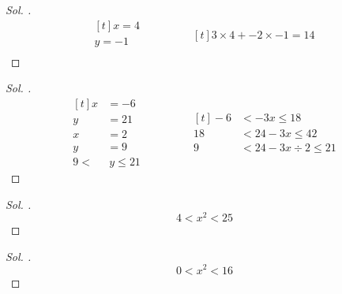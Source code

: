 \documentclass{article}
\theoremstyle{mytheoremstyle}
\theoremstyle{mytheoremstyle}
\theoremstyle{myproblemstyle}
\begin{document}
\begin{proof}[\textit{ Sol. }]
  \begin{equation*}
    \begin{aligned}[t]
      x = 4\\
      y = -1\\
    \end{aligned}
    \qquad\qquad
    \begin{aligned}[t]
      3 \times 4 + -2 \times -1 = 14
    \end{aligned}
  \end{equation*}
\end{proof}

\begin{problem}[$ -6 \le x < 2 $, $ 3x + 2y = 24 $ ise $ y $'nin tanım aralığı?]
\end{problem}

\begin{proof}[\textit{ Sol. }]
  \begin{equation*}
    \begin{aligned}[t]
      x &= -6\\
      y &= 21\\
      x &= 2\\
      y &= 9\\
      9 <&\ y \le 21
    \end{aligned}
    \qquad\qquad
    \begin{aligned}[t]
      -6 &< -3x \le 18\\
      18 &< 24 - 3x \le 42\\
      9 &< 24 - 3x \div 2 \le 21
    \end{aligned}
  \end{equation*}
\end{proof}

\begin{problem}[$ 2 < x \le 5 $ ise $ x^2 = ? $]
\end{problem}

\begin{proof}[\textit{ Sol. }]
  $$ 4 < x^2 < 25 $$
\end{proof}

\begin{problem}[$ -4 < x < 3 $ ise $ x^2 = ? $]
\end{problem}

\begin{proof}[\textit{ Sol. }]
  $$ 0 < x^2 < 16 $$
\end{proof}


\begin{problem}[$ -2 < x < 5 $ ise $ (x^2 - 2x)_{max} = ? $]
\end{problem}
\end{document}
